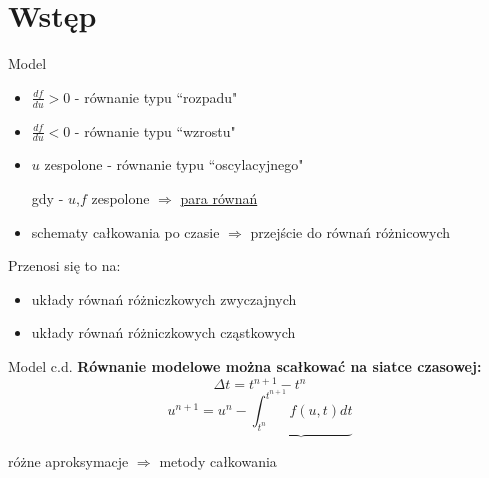\section{Wstęp}
\begin{frame}{Model}
  \begin{center}
  \end{center}
\begin{itemize}
    \item $\frac{df}{du} > 0$ - równanie typu ``rozpadu" 
    \item $\frac{df}{du} < 0$ - równanie typu ``wzrostu" \newline
    \item $u$ zespolone - równanie typu ``oscylacyjnego" \par
  \qquad\qquad gdy - $u$,$f$ zespolone $\Rightarrow$ \underline{para równań}
\end{itemize}

 \begin{itemize}
  \item schematy całkowania po czasie $\Rightarrow$ przejście do równań różnicowych
 \end{itemize}
 Przenosi się to na:
 \begin{itemize}
   \item układy równań różniczkowych zwyczajnych
   \item układy równań różniczkowych cząstkowych
 \end{itemize}
\end{frame}
\begin{frame}{Model c.d.}
  \textbf{Równanie modelowe można scałkować na siatce czasowej:}
  $$\Delta t = t^{n+1}-t^n$$
  $$u^{n+1} = u^n - \underbrace{\int_{t^n}^{t^{n+1}}f(u,t)dt}$$
  \begin{flushright}
    różne aproksymacje $\Rightarrow$ metody całkowania
  \end{flushright}
\end{frame}
